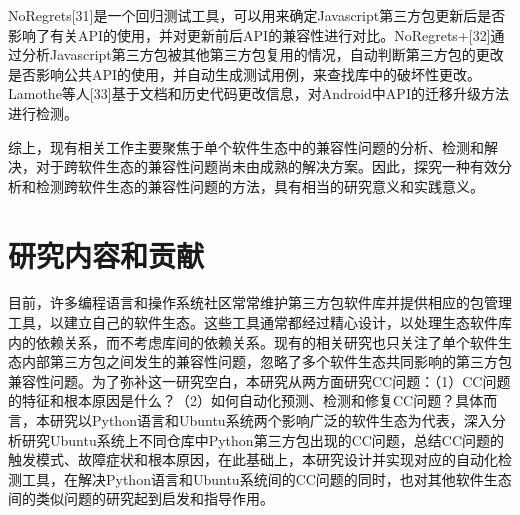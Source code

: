 NoRegrets[31]是一个回归测试工具，可以用来确定Javascript第三方包更新后是否影响了有关API的使用，并对更新前后API的兼容性进行对比。NoRegrets+[32]通过分析Javascript第三方包被其他第三方包复用的情况，自动判断第三方包的更改是否影响公共API的使用，并自动生成测试用例，来查找库中的破坏性更改。Lamothe等人[33]基于文档和历史代码更改信息，对Android中API的迁移升级方法进行检测。

综上，现有相关工作主要聚焦于单个软件生态中的兼容性问题的分析、检测和解决，对于跨软件生态的兼容性问题尚未由成熟的解决方案。因此，探究一种有效分析和检测跨软件生态的兼容性问题的方法，具有相当的研究意义和实践意义。


\section{研究内容和贡献}
目前，许多编程语言和操作系统社区常常维护第三方包软件库并提供相应的包管理工具，以建立自己的软件生态。这些工具通常都经过精心设计，以处理生态软件库内的依赖关系，而不考虑库间的依赖关系。现有的相关研究也只关注了单个软件生态内部第三方包之间发生的兼容性问题，忽略了多个软件生态共同影响的第三方包兼容性问题。为了弥补这一研究空白，本研究从两方面研究CC问题：（1）CC问题的特征和根本原因是什么？（2）如何自动化预测、检测和修复CC问题？具体而言，本研究以Python语言和Ubuntu系统两个影响广泛的软件生态为代表，深入分析研究Ubuntu系统上不同仓库中Python第三方包出现的CC问题，总结CC问题的触发模式、故障症状和根本原因，在此基础上，本研究设计并实现对应的自动化检测工具，在解决Python语言和Ubuntu系统间的CC问题的同时，也对其他软件生态间的类似问题的研究起到启发和指导作用。
